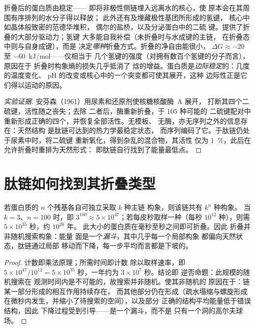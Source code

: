 \begin{proposition}[维持折叠的作用力]\label{prop:b3:structural-biology:forces}
折叠后的蛋白质由\emph{}稳定——
即将非极性侧链埋入远离水的核心，使
原本会在其周围有序排列的水分子得以释放；
此外还有及埋藏极性基团所形成的氢键，
核心中如晶体般致密的范德华堆积，
偶尔的盐桥，以及分泌蛋白中的二硫
键。提供了折叠的大部分驱动力；氢键
大多能自我补偿（未折叠时与水成键的主链，
在折叠态中则与自身成键），而是
决定\emph{哪种}折叠方式。折叠的净自由能很小，
$\Delta G \approx -20$ 至 \qty{-60}{kJ/mol}——仅相当于
几个氢键的强度（对拥有数百个氢键的分子而言），原因在于
折叠时构象熵的损失几乎抵消了
焓的增益。蛋白质是\emph{边际稳定}的：几度的温度变化、
pH 的改变或核心中的一个突变都可使其展开，这种
边际性正是它们得以运动的原因。
\end{proposition}

\begin{proof}[实验证据]
安芬森（1961）用尿素和还原剂使核糖核酸酶~A 展开，
打断其四个二硫键，活性随之丧失；去除
二者后，酶重新折叠，于 $105$ 种可能的
二硫键配对中重新形成正确的四个，并恢复全部活性。无模板、
无酶，亦无序列之外的信息存在：天然结构
是肽链可达到的热力学最稳定状态，
而序列编码了它。于肽链仍处于尿素中时，将二硫键
重新氧化，得到杂乱的混合物，其活性
仅为 \qty{1}{\%}，此后在允许折叠时重排为天然形式：
即肽链自行找到了能量最低点。
\end{proof}

\section{肽链如何找到其折叠类型}

\begin{theorem}[莱文索尔悖论]\label{thm:b3:structural-biology:levinthal}
若蛋白质的 $n$ 个残基各自可独立采取 $k$ 种主链
构象，则该链共有 $k^{n}$ 种构象。
当 $k = 3$、$n = 100$ 时，即 $3^{100} \approx
5\times 10^{47}$；若每皮秒取样一种（每秒 $10^{12}$
种），则需 $5\times 10^{35}$ 秒，约 $10^{28}$ 年。
此大小的蛋白质在毫秒至秒之间即可折叠。因此
折叠并非随机搜索构象：能量
面是一个\emph{漏斗}，其中几乎每一个局部构象
都偏向天然状态，肽链通过局部
移动而下降，每一步平均而言都是下坡的。
\end{theorem}
\begin{proof}
计数即乘法原理；所需时间即计数
除以取样速率，即 $5\times 10^{47}/10^{12} = 5\times
10^{35}$ 秒，一年约为 $3\times 10^{7}$ 秒。结论即
逆否命题：此规模的随机搜索在
观测时间内是不可能的，故搜索并非随机。使其非随机的
原因在于：链某一部分形成的相互作用持续存在，
而其他部分仍在形成（疏水塌缩与螺旋形成
在微秒内发生，并缩小了待搜索的空间），以及部分
正确的结构平均能量低于错误结构，因此
下降过程受到引导——是一个漏斗，而不是
只有一个洞的高尔夫球场。
\end{proof}

